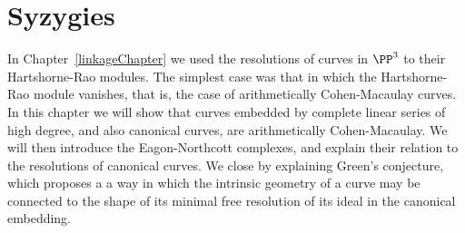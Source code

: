 

\chapter{Syzygies}
\label{SyzygiesChapter}

%
%
%
%
%
\def\length{{\rm length}}

%
%


In Chapter~\ref{linkageChapter} we used the resolutions of curves in $\PP^3$ to their Hartshorne-Rao modules. The
simplest case was that in which the Hartshorne-Rao module vanishes, that is, the case of arithmetically Cohen-Macaulay curves.
In this chapter we will show that curves embedded by complete linear series of high degree, and also canonical curves, are arithmetically
Cohen-Macaulay. We will then introduce the Eagon-Northcott complexes, and explain their relation to the resolutions of canonical curves. We close by explaining Green's conjecture, which proposes a a way in which the intrinsic geometry
of a curve may be connected to the shape of its minimal free resolution of its ideal in the canonical embedding.


